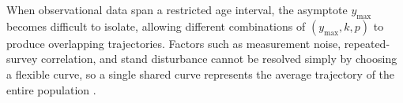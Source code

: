 
When observational data span a restricted age interval, the asymptote $y_{\max}$ becomes difficult to isolate, allowing different combinations of $(y_{\max}, k, p)$ to produce overlapping trajectories. Factors such as measurement noise, repeated-survey correlation, and stand disturbance cannot be resolved simply by choosing a flexible curve, so a single shared curve represents the average trajectory of the entire population \citep{rennolls1995Forest_C2_CR}.


